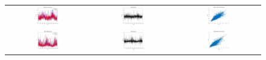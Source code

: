 \begin{figure}[ht!]
  \centering
  \begin{tabular}{ccc}
    \includegraphics[width=0.32\textwidth]{graphs/hybrid/12 hours/mean_fr/actual vs forecast.jpg} &
    \includegraphics[width=0.32\textwidth]{graphs/hybrid/12 hours/mean_fr/residuals.jpg} &
    \includegraphics[width=0.32\textwidth]{graphs/hybrid/12 hours/mean_fr/scatter plot.jpg} \\
    \includegraphics[width=0.32\textwidth]{graphs/hybrid/12 hours/s_wht/actual vs forecast.jpg} &
    \includegraphics[width=0.32\textwidth]{graphs/hybrid/12 hours/s_wht/residuals.jpg} &
    \includegraphics[width=0.32\textwidth]{graphs/hybrid/12 hours/s_wht/scatter plot.jpg} \\

\end{tabular}
\end{figure}
